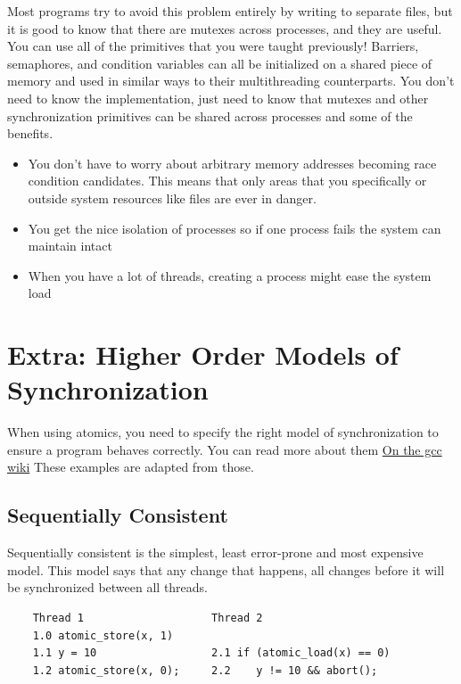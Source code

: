 Most programs try to avoid this problem entirely by writing to separate files, but it is good to know that there are mutexes across processes, and they are useful.
You can use all of the primitives that you were taught previously! Barriers, semaphores, and condition variables can all be initialized on a shared piece of memory and used in similar ways to their multithreading counterparts.
You don't need to know the implementation, just need to know that mutexes and other synchronization primitives can be shared across processes and some of the benefits.

\begin{itemize}
\tightlist
\item
  You don't have to worry about arbitrary memory addresses becoming race condition candidates. This means that only areas that you specifically  or outside system resources like files are ever in danger.
\item
  You get the nice isolation of processes so if one process fails the system can maintain intact
\item
  When you have a lot of threads, creating a process might ease the system load
\end{itemize}

\section{Extra: Higher Order Models of Synchronization}

When using atomics, you need to specify the right model of synchronization to ensure a program behaves correctly.
You can read more about them \href{https://gcc.gnu.org/wiki/Atomic/GCCMM/AtomicSync}{On the gcc wiki}
These examples are adapted from those.

\subsection{Sequentially Consistent}

Sequentially consistent is the simplest, least error-prone and most expensive model. This model says that any change that happens, all changes before it will be synchronized between all threads.

\begin{verbatim}
    Thread 1                    Thread 2
    1.0 atomic_store(x, 1)
    1.1 y = 10                  2.1 if (atomic_load(x) == 0)
    1.2 atomic_store(x, 0);     2.2    y != 10 && abort();
\end{verbatim}

